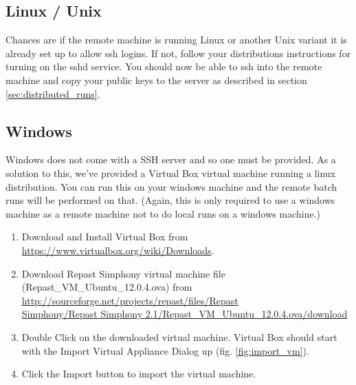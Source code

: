 \documentclass[11pt]{amsart}
\begin{document}
\subsection{Linux / Unix}
Chances are if the remote machine is running Linux or another Unix variant it is already set up to allow ssh logins. If not, follow your distributions instructions for turning on the sshd service. You should now be able to ssh into the remote machine and copy your public keys to the server as described in section \ref{sec:distributed_runs}.

\subsection{Windows}

Windows does not come with a SSH server and so one must be provided. As a solution to this, we've provided a Virtual Box virtual machine running a linux distribution. You can run this on your windows machine and the remote batch runs will be performed on that. (Again, this  is only required to use a windows machine as a remote machine not to do local runs on a windows machine.)

\begin{enumerate}
\item Download and Install Virtual Box from \href{https://www.virtualbox.org/wiki/Downloads}{https://www.virtualbox.org/wiki/Downloads}.
\item Download Repast Simphony  virtual machine file (Repast\_VM\_Ubuntu\_12.0.4.ova) from \href{http://sourceforge.net/projects/repast/files/Repast\%20Simphony/Repast\%20Simphony\%202.1/Repast_VM_Ubuntu_12.0.4.ova/download}
{http://sourceforge.net/projects/repast/files/Repast \\
Simphony/Repast Simphony 2.1/Repast\_VM\_Ubuntu\_12.0.4.ova/download}
\item Double Click on the downloaded virtual machine. Virtual Box should start with the Import Virtual Appliance Dialog up (fig. \ref{fig:import_vm}).
\item Click the Import button to import the virtual machine.
\end{enumerate}
\end{document}
